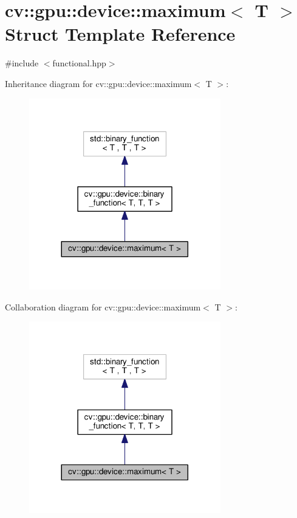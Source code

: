 \hypertarget{structcv_1_1gpu_1_1device_1_1maximum}{\section{cv\-:\-:gpu\-:\-:device\-:\-:maximum$<$ T $>$ Struct Template Reference}
\label{structcv_1_1gpu_1_1device_1_1maximum}
}


{\ttfamily \#include $<$functional.\-hpp$>$}



Inheritance diagram for cv\-:\-:gpu\-:\-:device\-:\-:maximum$<$ T $>$\-:\nopagebreak
\begin{figure}[H]
\begin{center}
\leavevmode
\includegraphics[width=236pt]{structcv_1_1gpu_1_1device_1_1maximum__inherit__graph}
\end{center}
\end{figure}


Collaboration diagram for cv\-:\-:gpu\-:\-:device\-:\-:maximum$<$ T $>$\-:\nopagebreak
\begin{figure}[H]
\begin{center}
\leavevmode
\includegraphics[width=236pt]{structcv_1_1gpu_1_1device_1_1maximum__coll__graph}
\end{center}
\end{figure}

